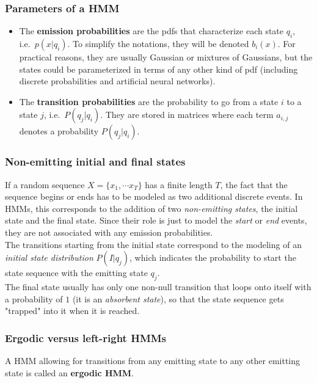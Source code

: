 \documentclass[11pt]{article}
\begin{document}
\subsubsection{Parameters of a HMM}
\label{sec:orgbf1ff12}
\begin{itemize}
\item The \textbf{emission probabilities} are the pdfs that characterize each state
\(q_i\), i.e. \(p(x|q_i)\). To simplify the notations, they will be
denoted \(b_i(x)\). For practical reasons, they are usually Gaussian or
mixtures of Gaussians, but the states could be parameterized in
terms of any other kind of pdf (including discrete probabilities and
artificial neural networks).
\item The \textbf{transition probabilities} are the probability to go from a state
\(i\) to a state \(j\), i.e. \(P(q_j|q_i)\). They are stored in matrices
where each term \(a_{i,j}\) denotes a probability \(P(q_j|q_i)\).
\end{itemize}

\subsubsection{Non-emitting initial and final states}
\label{sec:org8ee1b1e}
If a random sequence \(X=\{x_1,\cdots x_T\}\) has a finite length \(T\), the
fact that the sequence begins or ends has to be modeled as two
additional discrete events. In HMMs, this corresponds to the addition of
two \emph{non-emitting states}, the initial state and the final state. Since
their role is just to model the \emph{start} or \emph{end} events, they are not
associated with any emission probabilities.\\
The transitions starting from the initial state correspond to the
modeling of an \emph{initial state distribution} \(P(I|q_j)\), which indicates
the probability to start the state sequence with the emitting state
\(q_j\).\\
The final state usually has only one non-null transition that loops onto
itself with a probability of \(1\) (it is an \emph{absorbent state}), so that
the state sequence gets "trapped" into it when it is reached.

\subsubsection{Ergodic versus left-right HMMs}
\label{sec:org38bb580}
A HMM allowing for transitions from any emitting state to any other
emitting state is called an \textbf{ergodic HMM}.
\end{document}
